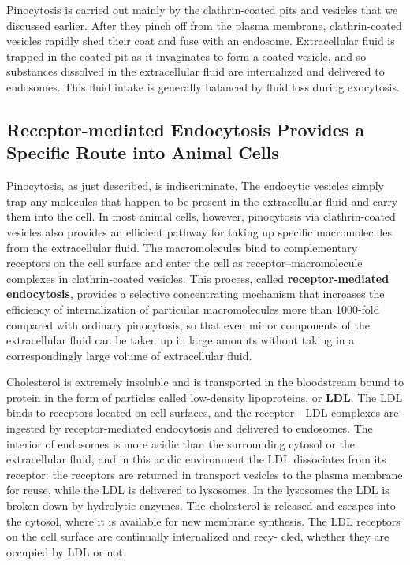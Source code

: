 Pinocytosis is carried out mainly by the clathrin-coated pits and vesicles
that we discussed earlier. After they pinch
off from the plasma membrane, clathrin-coated vesicles rapidly shed their
coat and fuse with an endosome. Extracellular fluid is trapped in the coated
pit as it invaginates to form a coated vesicle, and so substances dissolved
in the extracellular fluid are internalized and delivered to endosomes. This
fluid intake is generally balanced by fluid loss during exocytosis.

\subsection{Receptor-mediated Endocytosis Provides a Specific Route into Animal Cells}

Pinocytosis, as just described, is indiscriminate. The endocytic vesicles
simply trap any molecules that happen to be present in the extracellular
fluid and carry them into the cell. In most animal cells, however, pinocytosis 
via clathrin-coated vesicles also provides an efficient pathway for
taking up specific macromolecules from the extracellular fluid. The macromolecules 
bind to complementary receptors on the cell surface and
enter the cell as receptor–macromolecule complexes in clathrin-coated
vesicles. This process, called \textbf{receptor-mediated endocytosis}, provides
a selective concentrating mechanism that increases the efficiency of
internalization of particular macromolecules more than 1000-fold compared 
with ordinary pinocytosis, so that even minor components of the
extracellular fluid can be taken up in large amounts without taking in a
correspondingly large volume of extracellular fluid.

Cholesterol is extremely insoluble and is transported in the bloodstream
bound to protein in the form of particles called low-density lipoproteins,
or \textbf{LDL}. The LDL binds to receptors located on cell surfaces, and the
receptor - LDL complexes are ingested by receptor-mediated endocytosis
and delivered to endosomes. The interior of endosomes is more acidic
than the surrounding cytosol or the extracellular fluid, and in this acidic
environment the LDL dissociates from its receptor: the receptors are
returned in transport vesicles to the plasma membrane for reuse, while
the LDL is delivered to lysosomes. In the lysosomes the LDL is broken
down by hydrolytic enzymes. The cholesterol is released and escapes
into the cytosol, where it is available for new membrane synthesis. The
LDL receptors on the cell surface are continually internalized and recy-
cled, whether they are occupied by LDL or not

